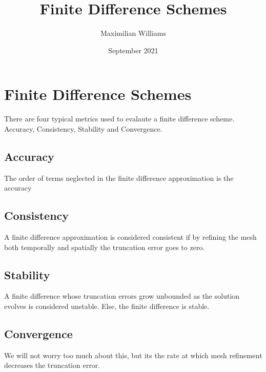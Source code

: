\documentclass{article}
\title{Finite Difference Schemes}
\author{Maximilian Williams}
\date{September 2021}
\begin{document}
\maketitle

\section*{Finite Difference Schemes}
There are four typical metrics used to evalaute a finite difference scheme. Accuracy, Consistency, Stability and Convergence.

\subsection*{Accuracy}
The order of terms neglected in the finite difference approximation is the accuracy

\subsection*{Consistency}
A finite difference approximation is considered consistent if by refining the mesh both temporally and spatially the truncation error goes to zero.

\subsection*{Stability}
A finite difference whose truncation errors grow unbounded as the solution evolves is considered unstable. Else, the finite difference is stable.

\subsection*{Convergence}
We will not worry too much about this, but its the rate at which mesh refinement decreases the truncation error.
\end{document}
